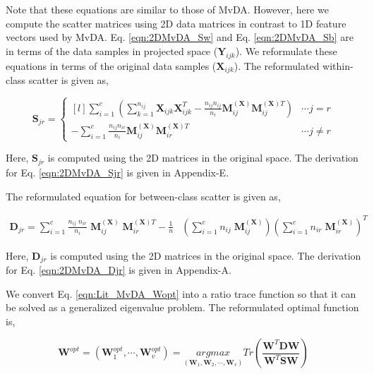 Note that these equations are similar to those of MvDA. However, here we compute the scatter matrices using 2D data matrices in contrast to 1D feature vectors used by MvDA. Eq. \ref{eqn:2DMvDA_Sw} and Eq. \ref{eqn:2DMvDA_Sb} are in terms of the data samples in projected space ($\textbf{Y}_{ijk}$). We reformulate these equations in terms of the original data samples ($\textbf{X}_{ijk}$). The reformulated within-class scatter is given as,


\begin{equation}
\label{eqn:2DMvDA_Sjr}
\textbf{S}_{jr} = \left\{\begin{matrix*}[l]
\sum_{i=1}^{c} \left ( \sum_{k=1}^{n_{ij}} \textbf{X}_{ijk }\textbf{X}_{ijk}^T - \frac{n_{ij} n_{ij}}{n_i} \textbf{M}_{ij}^{(\textbf{X})} \textbf{M}_{ij}^{(\textbf{X})T} \right ) & \cdots j=r \\ 
-\sum_{i=1}^{c} \frac{n_{ij} n_{ir}}{n_i} \textbf{M}_{ij}^{(\textbf{X})} \textbf{M}_{ir}^{(\textbf{X})T} & \cdots j\neq r 
\end{matrix*}\right.
\end{equation}

\noindent
Here, $\textbf{S}_{jr}$ is computed using the 2D matrices in the original space. The derivation for Eq. \ref{eqn:2DMvDA_Sjr} is given in Appendix-E.%

\noindent
The reformulated equation for between-class scatter is given as,


\begin{equation}
\label{eqn:2DMvDA_Djr}
\begin{split}
\textbf{D}_{jr} = \sum_{i=1}^{c} \frac{n_{ij} \; n_{ir}}{n_i} \; \textbf{M}_{ij}^{(\textbf{X})} \; \textbf{M}_{ir}^{(\textbf{X})T} - \frac{1}{n} & \left ( \sum_{i=1}^{c} n_{ij} \; \textbf{M}_{ij}^{(\textbf{X})} \right )\left ( \sum_{i=1}^{c} n_{ir} \; \textbf{M}_{ir}^{(\textbf{X})} \right )^T
\end{split}
\end{equation}

Here, $\textbf{D}_{jr}$ is computed using the 2D matrices in the original space. The derivation for Eq. \ref{eqn:2DMvDA_Djr} is given in Appendix-A.%

We convert Eq. \ref{eqn:Lit_MvDA_Wopt} into a ratio trace function so that it can be solved as a generalized eigenvalue problem. The reformulated optimal function is,

\begin{equation}
\label{eqn:2DMvDA_WoptRT}
\textbf{W}^{opt} = \left( \textbf{W}_1^{opt}, \cdots, \textbf{W}_v^{opt} \right) = \underset{(\textbf{W}_1,\textbf{W}_2,\cdots,\textbf{W}_v)}{argmax}Tr\left ( \frac{\textbf{W}^T \textbf{D} \textbf{W}}{\textbf{W}^T \textbf{S} \textbf{W}} \right )
\end{equation}

